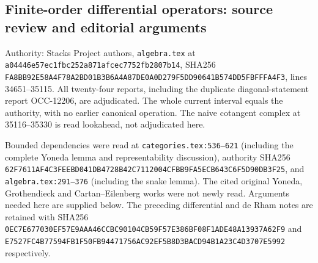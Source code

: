 \subsection{Finite-order differential operators: source review and editorial arguments}\label{algebra-proof-043-finite-order-differential-operators-source-review-and-editorial-arguments}

Authority: Stacks Project authors, \texttt{algebra.tex} at \texttt{a044\allowbreak{}46e5\allowbreak{}7ec1\allowbreak{}fbc2\allowbreak{}52a8\allowbreak{}71af\allowbreak{}cec7\allowbreak{}752f\allowbreak{}b280\allowbreak{}7b14}, SHA256 \texttt{FA8B\allowbreak{}B92E\allowbreak{}58A4\allowbreak{}F78A\allowbreak{}2BD0\allowbreak{}1B3B\allowbreak{}6A4A\allowbreak{}87DE\allowbreak{}0A0D\allowbreak{}279F\allowbreak{}5DD9\allowbreak{}0641\allowbreak{}B574\allowbreak{}DD5F\allowbreak{}BFFF\allowbreak{}A4F3}, lines 34651--35115. All twenty-four reports, including the duplicate diagonal-statement report OCC-12206, are adjudicated. The whole current interval equals the authority, with no earlier canonical operation. The naive cotangent complex at 35116--35330 is read lookahead, not adjudicated here.

Bounded dependencies were read at \texttt{categories.\AlgebraIdentifierBreak{}tex:\AlgebraIdentifierBreak{}536–\AlgebraIdentifierBreak{}621} (including the complete Yoneda lemma and representability discussion), authority SHA256 \texttt{62F7\allowbreak{}611A\allowbreak{}F4C3\allowbreak{}FEEB\allowbreak{}D041\allowbreak{}DB47\allowbreak{}28B4\allowbreak{}2C71\allowbreak{}1200\allowbreak{}4CFB\allowbreak{}B9FA\allowbreak{}5ECB\allowbreak{}643C\allowbreak{}6F5D\allowbreak{}90DB\allowbreak{}3F25}, and \texttt{algebra.\AlgebraIdentifierBreak{}tex:\AlgebraIdentifierBreak{}291–\AlgebraIdentifierBreak{}376} (including the snake lemma). The cited original Yoneda, Grothendieck and Cartan--Eilenberg works were not newly read. Arguments needed here are supplied below. The preceding differential and de Rham notes are retained with SHA256 \texttt{0EC7\allowbreak{}E677\allowbreak{}030E\allowbreak{}F57E\allowbreak{}9AAA\allowbreak{}46CC\allowbreak{}BC90\allowbreak{}104C\allowbreak{}B59F\allowbreak{}57E3\allowbreak{}86BF\allowbreak{}08F1\allowbreak{}ADE4\allowbreak{}8A13\allowbreak{}937A\allowbreak{}62F9} and \texttt{E752\allowbreak{}7FC4\allowbreak{}B775\allowbreak{}94FB\allowbreak{}1F50\allowbreak{}FB94\allowbreak{}4717\allowbreak{}56AC\allowbreak{}92EF\allowbreak{}5B8D\allowbreak{}3BAC\allowbreak{}D94B\allowbreak{}1A23\allowbreak{}C4D3\allowbreak{}707E\allowbreak{}5992} respectively.

